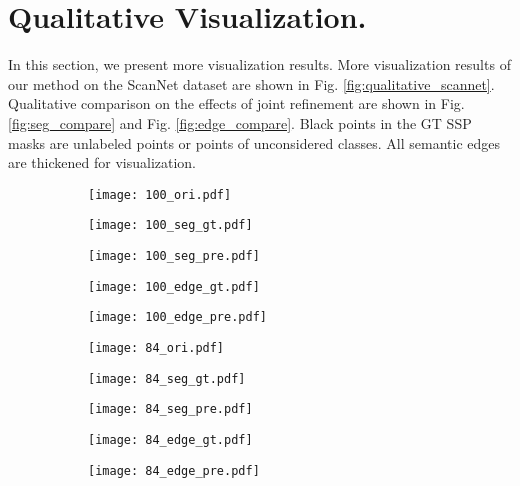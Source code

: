 \documentclass[runningheads]{llncs}
\begin{document}
\section{Qualitative Visualization.}\label{qualitative}
In this section, we present more visualization results. More visualization results of our method on the ScanNet dataset are shown in Fig. \ref{fig:qualitative_scannet}. Qualitative comparison on the effects of joint refinement are shown in Fig. \ref{fig:seg_compare} and Fig. \ref{fig:edge_compare}. Black points in the GT SSP masks are unlabeled points or points of unconsidered classes. All semantic edges are thickened for visualization.

\begin{figure}
\captionsetup[subfigure]{labelformat=empty}
\begin{subfigure}{.193\textwidth}
  \centering
  \texttt{[image: 100\_ori.pdf]}
\end{subfigure} \hfil
\begin{subfigure}{.193\textwidth}
  \centering
  \texttt{[image: 100\_seg\_gt.pdf]}
\end{subfigure} \hfil
\begin{subfigure}{.193\textwidth}
  \centering
  \texttt{[image: 100\_seg\_pre.pdf]}
\end{subfigure} \hfil
\begin{subfigure}{.193\textwidth}
  \centering
  \texttt{[image: 100\_edge\_gt.pdf]}
\end{subfigure} \hfil
\begin{subfigure}{.193\textwidth}
  \centering
  \texttt{[image: 100\_edge\_pre.pdf]}
\end{subfigure}

\begin{subfigure}{.193\textwidth}
  \centering
  \texttt{[image: 84\_ori.pdf]}
\end{subfigure} \hfil
\begin{subfigure}{.193\textwidth}
  \centering
  \texttt{[image: 84\_seg\_gt.pdf]}
\end{subfigure} \hfil
\begin{subfigure}{.193\textwidth}
  \centering
  \texttt{[image: 84\_seg\_pre.pdf]}
\end{subfigure} \hfil
\begin{subfigure}{.193\textwidth}
  \centering
  \texttt{[image: 84\_edge\_gt.pdf]}
\end{subfigure} \hfil
\begin{subfigure}{.193\textwidth}
  \centering
  \texttt{[image: 84\_edge\_pre.pdf]}
\end{subfigure}


\end{figure}
\end{document}
